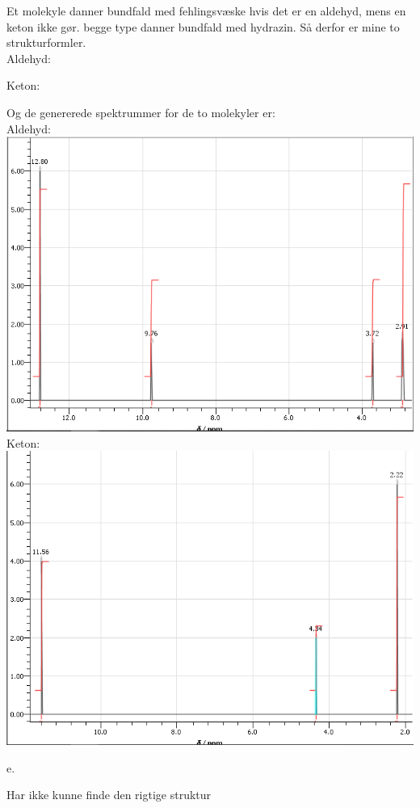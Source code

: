 \documentclass[12pt]{article}
\begin{document}
Et molekyle danner bundfald med fehlingsvæske hvis det er en aldehyd, mens en
keton ikke gør. begge type danner bundfald med hydrazin. Så derfor er mine to
strukturformler.\\
Aldehyd:\\
\begin{center}
\end{center}
Keton:\\
\begin{center}
\end{center}
Og de genererede spektrummer for de to molekyler er:\\
Aldehyd:\\
\includegraphics[width=\textwidth]{aldehyd.png}\\
Keton:\\
\includegraphics[width=\textwidth]{keton.png}

e.

Har ikke kunne finde den rigtige struktur
\end{document}
